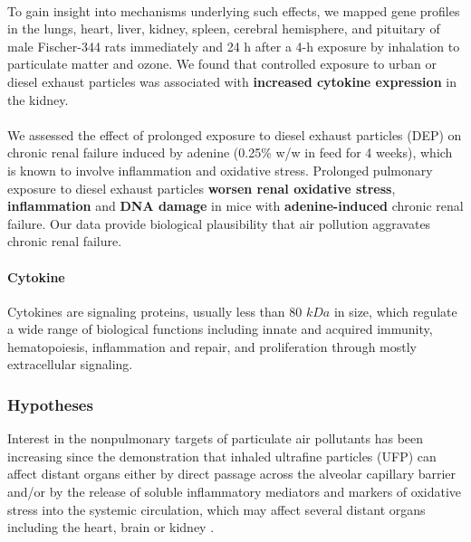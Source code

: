 \documentclass[11pt]{article}
\begin{document}
\paragraph{\citet{thomson2013mapping}} To gain insight into mechanisms underlying such effects, we mapped gene profiles in the lungs, heart, liver, kidney, spleen, cerebral hemisphere, and pituitary of male Fischer-344 rats immediately and 24 h after a 4-h exposure by inhalation to particulate matter and ozone. We found that controlled exposure to urban or diesel exhaust particles was associated with \textbf{increased cytokine expression} in the kidney.

\paragraph{\citet{nemmar2016prolonged}} We assessed the effect of prolonged exposure to diesel exhaust particles (DEP) on chronic renal failure induced by adenine (0.25\% w/w in feed for 4 weeks), which is known to involve inflammation and oxidative stress. Prolonged pulmonary exposure to diesel exhaust particles \textbf{worsen renal oxidative stress}, \textbf{inflammation} and \textbf{DNA damage} in mice with \textbf{adenine-induced} chronic renal failure. Our data provide biological plausibility that air pollution aggravates chronic renal failure.

\paragraph{Cytokine} Cytokines are signaling proteins, usually less than 80 $kDa$ in size, which regulate a wide range of biological functions including innate and acquired immunity, hematopoiesis, inflammation and repair, and proliferation through mostly extracellular signaling. 

\subsubsection{Hypotheses}

Interest in the nonpulmonary targets of particulate air pollutants has been increasing since the demonstration that inhaled ultrafine particles (UFP) can affect distant organs either by direct passage across the alveolar capillary barrier and/or by the release of soluble inflammatory mediators and markers of oxidative stress into the systemic circulation, which may affect several distant organs including the heart, brain or kidney \citep{nemmar2013recent, nemmar2004possible, oberdorster2005nanotoxicology, peters2006translocation, vermylen2005ambient}. 
\end{document}
